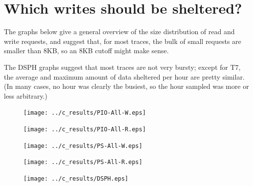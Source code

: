 \documentclass[10pt]{article}
\begin{document}
\section{Which writes should be sheltered?}

The graphs below give a general overview of the size distribution of read and write requests, 
and suggest that, for most traces, the bulk of small requests are smaller than 8KB,
so an 8KB cutoff might make sense.

The DSPH graphs suggest that most traces are not very bursty;
except for T7, the average and maximum amount of data sheltered per hour are pretty similar.
(In many cases, no hour was clearly the busiest, so the hour sampled was more or less arbitrary.)

\begin{figure}
  \centering
  \begin{minipage}{.5\textwidth}
    \centering
    \texttt{[image: ../c\_results/PIO-All-W.eps]}
  \end{minipage}%
  \begin{minipage}{.5\textwidth}
    \centering
    \texttt{[image: ../c\_results/PIO-All-R.eps]}
  \end{minipage}

  \begin{minipage}{.5\textwidth}
    \centering
    \texttt{[image: ../c\_results/PS-All-W.eps]}
  \end{minipage}%
  \begin{minipage}{.5\textwidth}
    \centering
    \texttt{[image: ../c\_results/PS-All-R.eps]}
  \end{minipage}
\end{figure}

\begin{figure}
  \texttt{[image: ../c\_results/DSPH.eps]}
\end{figure}
\end{document}
